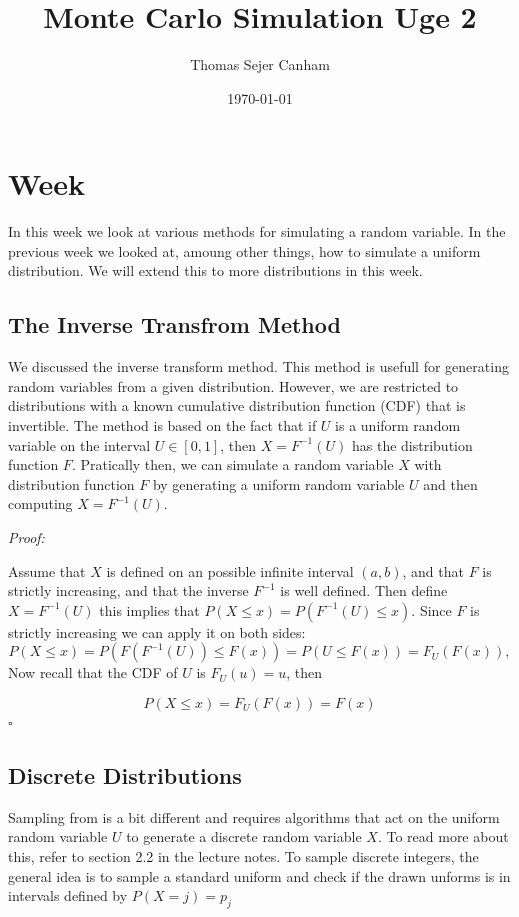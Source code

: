 \documentclass{article}
\title{Monte Carlo Simulation Uge 2}
\author{Thomas Sejer Canham}
\date{\today}
\theoremstyle{definition}
\theoremstyle{remark}
\begin{document}

%
%

\section{Week}

In this week we look at various methods for simulating a random variable. In the previous week we looked at, amoung other things, how to simulate a uniform distribution. We will extend this to more distributions in this week.

\subsection{The Inverse Transfrom Method}

We discussed the inverse transform method. This method is usefull for generating random variables from a given distribution. However, we are restricted to distributions with a known cumulative distribution function (CDF) that is invertible. The method is based on the fact that if $U$ is a uniform random variable on the interval $U \in [0, 1]$, then $X = F^{-1}(U)$ has the distribution function $F$. Pratically then, we can simulate a random variable $X$ with distribution function $F$ by generating a uniform random variable $U$ and then computing $X = F^{-1}(U)$.  \vspace{1em}

\emph{Proof:} \vspace{0.5cm}

Assume that $X$ is defined on an possible infinite interval $(a,b)$, and that $F$ is strictly increasing, and that the inverse $F^{-1}$ is well defined. Then define $X = F^{-1}(U)$ this implies that $P(X \leq x) = P( F^{-1}(U) \leq x)$. Since $F$ is strictly increasing we can apply it on both sides:
$$
P(X \leq x) = P(F(F^{-1}(U)) \leq F(x)) = P(U\leq F(x)) = F_U(F(x)),
$$
Now recall that the CDF of $U$ is $F_U(u) = u$, then

$$P(X\leq x) = F_U(F(x)) = F(x)$$
$\square$
\subsection{Discrete Distributions}
Sampling from is a bit different and requires algorithms that act on the uniform random variable $U$ to generate a discrete random variable $X$. To read more about this, refer to section 2.2 in the lecture notes. To sample discrete integers, the general idea is to sample a standard uniform and check if the drawn unforms is in intervals defined by $P(X = j) = p_j$
\end{document}
